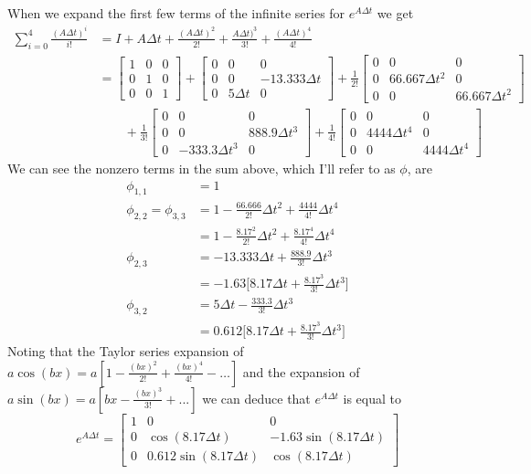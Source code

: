 \documentclass[11pt]{article}
\begin{document}
\subparagraph{}
When we expand the first few terms of the infinite series for $e^{A\Delta t}$ we get
\begin{align*}
	\sum_{i=0}^4 \frac{(A\Delta t)^i}{i!} &= I + A\Delta t + \frac{(A\Delta t)^2}{2!} + \frac{A\Delta t)^3}{3!} + \frac{(A\Delta t)^4}{4!} \\
	&= \begin{bmatrix} 1 & 0 & 0 \\
					   0 & 1 & 0 \\
					   0 & 0 & 1 \end{bmatrix} + 
	   \begin{bmatrix} 0 & 0 & 0 \\
	   				   0 & 0 & -13.333\Delta t \\
	   				   0 & 5\Delta t & 0 \end{bmatrix} 
	   + \frac{1}{2!} 
	   \begin{bmatrix} 0 & 0 & 0 \\
	   				   0 & 66.667\Delta t^2 & 0 \\
	   				   0 & 0 & 66.667\Delta t^2 \end{bmatrix} \\
	   &\qquad + \frac{1}{3!}
	   \begin{bmatrix} 0 & 0 & 0 \\
	   				   0 & 0 & 888.9\Delta t^3 \\
	   				   0 & -333.3\Delta t^3 & 0 \end{bmatrix}
	   + \frac{1}{4!}
	   \begin{bmatrix} 0 & 0 & 0 \\
	   				   0 & 4444\Delta t^4 & 0 \\
	   				   0 & 0 & 4444\Delta t^4 \end{bmatrix}
\end{align*}
We can see the nonzero terms in the sum above, which I'll refer to as $\phi$, are
\begin{align*}
	\phi_{1,1} &= 1 \\
	\phi_{2,2} = \phi_{3,3} &= 1-\frac{66.666}{2!}\Delta t^2 + \frac{4444}{4!}\Delta t^4 \\
	&= 1 - \frac{8.17^2}{2!}\Delta t^2 + \frac{8.17^4}{4!}\Delta t^4 \\
	\phi_{2,3} &= -13.333\Delta t + \frac{888.9}{3!}\Delta t^3 \\
	&= -1.63 \Big[8.17\Delta t + \frac{8.17^3}{3!}\Delta t^3 \Big] \\
	\phi_{3,2} &= 5\Delta t - \frac{333.3}{3!}\Delta t^3 \\
	&= 0.612 \Big[8.17\Delta t + \frac{8.17^3}{3!}\Delta t^3 \Big]
\end{align*}
Noting that the Taylor series expansion of $a\cos(bx) = a[1-\frac{(bx)^2}{2!}+\frac{(bx)^4}{4!} - \dots]$ and the expansion of $a\sin(bx) = a[bx-\frac{(bx)^3}{3!} + ...]$ we can deduce that $e^{A\Delta t}$ is equal to
\begin{equation*}
	e^{A\Delta t} = \begin{bmatrix} 1 & 0 & 0 \\
		0 & \cos(8.17\Delta t) & -1.63\sin(8.17\Delta t) \\
		0 & 0.612\sin(8.17\Delta t) & \cos(8.17\Delta t)
		\end{bmatrix}
\end{equation*}
\end{document}

